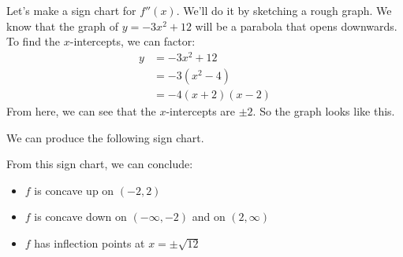 \documentclass{article}
\begin{document}
\begin{enumerate}
\begin{enumerate}
    \begin{solution}
      Let's make a sign chart for $f''(x)$. We'll do it by sketching a rough graph. We know that the graph
      of $y=-3x^2+12$ will be a parabola that opens downwards. To find the $x$-intercepts, we can factor:
      \begin{align*}
          y &= -3x^2 + 12\\
          &= -3(x^2-4)\\
          &= -4(x+2)(x-2)
      \end{align*}
      From here, we can see that the $x$-intercepts are $\pm 2$. So the graph looks like this.  
       \begin{center}
      \end{center}

      We can produce the following sign chart.
       \begin{center}
      \end{center}
      
      From this sign chart, we can conclude:
      \begin{itemize}
        \item $f$ is concave up on $(-2,2)$
        \item $f$ is concave down on $(-\infty,-2)$ and on $(2, \infty)$
        \item $f$ has inflection points at $x=\pm \sqrt{12}$
      \end{itemize}
    \end{solution}


\end{enumerate}
\end{enumerate}
\end{document}
